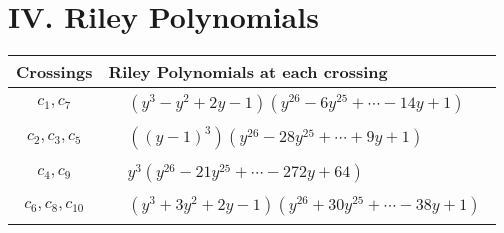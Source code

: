 \documentclass[1p]{elsarticle_modified}
\theoremstyle{definition}
\begin{document}
\centering \section*{ IV. Riley Polynomials}
\begin{tabular}{m{50pt}|m{274pt}}
Crossings & \hspace{64pt}Riley Polynomials at each crossing \\
\hline $$\begin{aligned}c_{1},c_{7}\end{aligned}$$&$\begin{aligned}
&(y^3- y^2+2 y-1)(y^{26}-6 y^{25}+\cdots-14 y+1)
\end{aligned}$\\
\hline $$\begin{aligned}c_{2},c_{3},c_{5}\end{aligned}$$&$\begin{aligned}
&((y-1)^3)(y^{26}-28 y^{25}+\cdots+9 y+1)
\end{aligned}$\\
\hline $$\begin{aligned}c_{4},c_{9}\end{aligned}$$&$\begin{aligned}
&y^3(y^{26}-21 y^{25}+\cdots-272 y+64)
\end{aligned}$\\
\hline $$\begin{aligned}c_{6},c_{8},c_{10}\end{aligned}$$&$\begin{aligned}
&(y^3+3 y^2+2 y-1)(y^{26}+30 y^{25}+\cdots-38 y+1)
\end{aligned}$\\
\hline
\end{tabular}
\vskip 2pc
\end{document}
